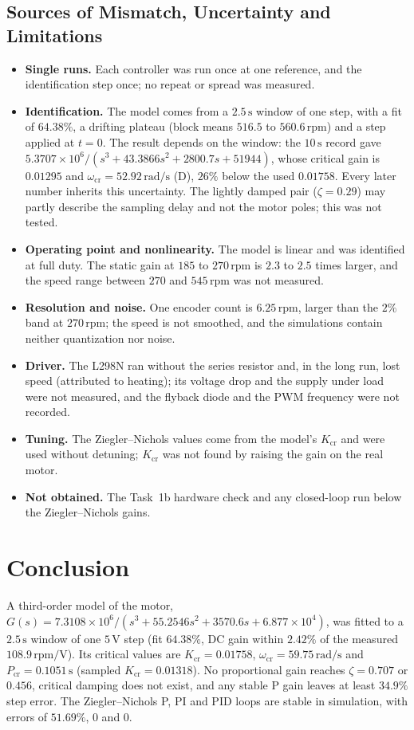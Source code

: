 \documentclass[lettersize,journal]{IEEEtran}
\newcommand{\Kcr}{K_{\mathrm{cr}}}
\newcommand{\wcr}{\omega_{\mathrm{cr}}}
\newcommand{\Pcr}{P_{\mathrm{cr}}}
\newcommand{\rpm}{\,\text{rpm}}
\begin{document}
\subsection{Sources of Mismatch, Uncertainty and Limitations}
\begin{itemize}
\item \textbf{Single runs.} Each controller was run once at one reference, and the identification step once; no repeat or spread was measured.
\item \textbf{Identification.} The model comes from a $2.5\,\text{s}$ window of one step, with a fit of $64.38\%$, a drifting plateau (block means $516.5$ to $560.6\rpm$) and a step applied at $t=0$. The result depends on the window: the $10\,\text{s}$ record gave $5.3707\times10^{6}/(s^3+43.3866s^2+2800.7s+51944)$, whose critical gain is $0.01295$ and $\wcr=52.92\,\text{rad/s}$ (D), $26\%$ below the used $0.01758$. Every later number inherits this uncertainty. The lightly damped pair ($\zeta=0.29$) may partly describe the sampling delay and not the motor poles; this was not tested.
\item \textbf{Operating point and nonlinearity.} The model is linear and was identified at full duty. The static gain at $185$ to $270\rpm$ is $2.3$ to $2.5$ times larger, and the speed range between $270$ and $545\rpm$ was not measured.
\item \textbf{Resolution and noise.} One encoder count is $6.25\rpm$, larger than the $2\%$ band at $270\rpm$; the speed is not smoothed, and the simulations contain neither quantization nor noise.
\item \textbf{Driver.} The L298N ran without the series resistor and, in the long run, lost speed (attributed to heating); its voltage drop and the supply under load were not measured, and the flyback diode and the PWM frequency were not recorded.
\item \textbf{Tuning.} The Ziegler--Nichols values come from the model's $\Kcr$ and were used without detuning; $\Kcr$ was not found by raising the gain on the real motor.
\item \textbf{Not obtained.} The Task~1b hardware check and any closed-loop run below the Ziegler--Nichols gains.
\end{itemize}

\section{Conclusion}
A third-order model of the motor, $G(s)=7.3108\times10^{6}/(s^3+55.2546s^2+3570.6s+6.877\times10^{4})$, was fitted to a $2.5\,\text{s}$ window of one $5\,\text{V}$ step (fit $64.38\%$, DC gain within $2.42\%$ of the measured $108.9\rpm/\text{V}$). Its critical values are $\Kcr=0.01758$, $\wcr=59.75\,\text{rad/s}$ and $\Pcr=0.1051\,\text{s}$ (sampled $\Kcr=0.01318$). No proportional gain reaches $\zeta=0.707$ or $0.456$, critical damping does not exist, and any stable P gain leaves at least $34.9\%$ step error. The Ziegler--Nichols P, PI and PID loops are stable in simulation, with errors of $51.69\%$, $0$ and $0$.
\end{document}
